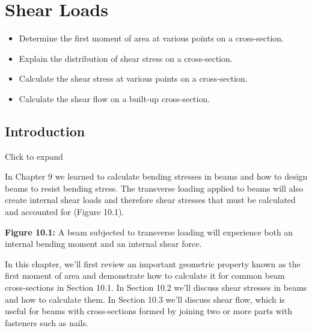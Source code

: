 \documentclass[
  letterpaper,
  DIV=11,
  numbers=noendperiod]{scrreprt}
\providecommand{\tightlist}{%
  \setlength{\itemsep}{0pt}\setlength{\parskip}{0pt}}\usepackage{longtable,booktabs,array}
\begin{document}

\chapter{Shear Loads}\label{sec-shear-loads}

\begin{tcolorbox}[enhanced jigsaw, breakable, opacityback=0, toptitle=1mm, left=2mm, colback=white, opacitybacktitle=0.6, colframe=quarto-callout-note-color-frame, titlerule=0mm, arc=.35mm, leftrule=.75mm, bottomtitle=1mm, colbacktitle=quarto-callout-note-color!10!white, rightrule=.15mm, title={Learning Objectives}, bottomrule=.15mm, toprule=.15mm, coltitle=black]

\begin{itemize}
\tightlist
\item
  Determine the first moment of area at various points on a
  cross-section.
\item
  Explain the distribution of shear stress on a cross-section.
\item
  Calculate the shear stress at various points on a cross-section.
\item
  Calculate the shear flow on a built-up cross-section.
\end{itemize}

\end{tcolorbox}

\section*{Introduction}\label{introduction-10}


Click to expand

In Chapter 9 we learned to calculate bending stresses in beams and how
to design beams to resist bending stress. The transverse loading applied
to beams will also create internal shear loads and therefore shear
stresses that must be calculated and accounted for (Figure 10.1).

\textbf{Figure 10.1:} A beam subjected to transverse loading will
experience both an internal bending moment and an internal shear force.

In this chapter, we'll first review an important geometric property
known as the first moment of area and demonstrate how to calculate it
for common beam cross-sections in Section 10.1. In Section 10.2 we'll
discuss shear stresses in beams and how to calculate them. In Section
10.3 we'll discuss shear flow, which is useful for beams with
cross-sections formed by joining two or more parts with fasteners such
as nails.
\end{document}
